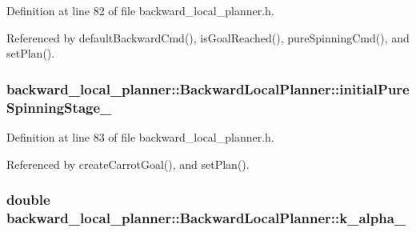 Definition at line 82 of file backward\+\_\+local\+\_\+planner.\+h.



Referenced by default\+Backward\+Cmd(), is\+Goal\+Reached(), pure\+Spinning\+Cmd(), and set\+Plan().

\subsubsection[{\texorpdfstring{initial\+Pure\+Spinning\+Stage\+\_\+}{initialPureSpinningStage_}}]{ backward\+\_\+local\+\_\+planner\+::\+Backward\+Local\+Planner\+::initial\+Pure\+Spinning\+Stage\+\_\+\hspace{0.3cm}{\ttfamily [private]}}\hypertarget{classbackward__local__planner_1_1BackwardLocalPlanner_ae03594253808527b547901baa5480d41}{}\label{classbackward__local__planner_1_1BackwardLocalPlanner_ae03594253808527b547901baa5480d41}


Definition at line 83 of file backward\+\_\+local\+\_\+planner.\+h.



Referenced by create\+Carrot\+Goal(), and set\+Plan().

\subsubsection[{\texorpdfstring{k\+\_\+alpha\+\_\+}{k_alpha_}}]{\setlength{\rightskip}{0pt plus 5cm}double backward\+\_\+local\+\_\+planner\+::\+Backward\+Local\+Planner\+::k\+\_\+alpha\+\_\+\hspace{0.3cm}{\ttfamily [private]}}\hypertarget{classbackward__local__planner_1_1BackwardLocalPlanner_ab8a4ea2b7fe9f21c07acac7121d4dd3e}{}\label{classbackward__local__planner_1_1BackwardLocalPlanner_ab8a4ea2b7fe9f21c07acac7121d4dd3e}



